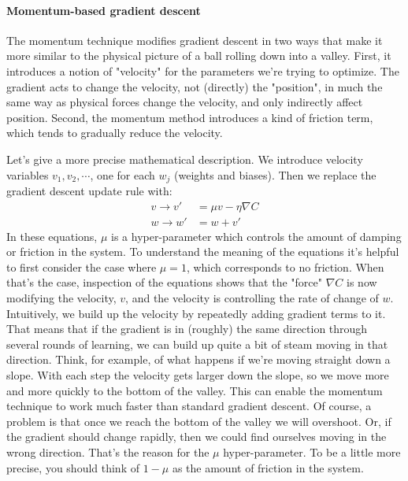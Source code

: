 \documentclass[12pt, letterpaper]{article}
\theoremstyle{definition}
\let\tb\textbf
\begin{document}
\paragraph{\tb{Momentum-based gradient descent}} The momentum technique modifies gradient descent in two ways that make it more similar to the physical picture of a ball rolling down into a valley. First, it introduces a notion of "velocity" for the parameters we're trying to optimize. The gradient acts to change the velocity, not (directly) the "position", in much the same way as physical forces change the velocity, and only indirectly affect position. Second, the momentum method introduces a kind of friction term, which tends to gradually reduce the velocity.

Let's give a more precise mathematical description. We introduce velocity variables $v_1, v_2, \cdots$, one for each $w_j$ (weights and biases). Then we replace the gradient descent update rule with:
\begin{equation}
\begin{aligned}
v \rightarrow v' &= \mu  v - \eta \nabla C \\
w \rightarrow w' &= w + v'
\end{aligned}
\end{equation}
In these equations, $\mu$ is a hyper-parameter which controls the amount of damping or friction in the system. To understand the meaning of the equations it's helpful to first consider the case where $\mu=1$, which corresponds to no friction. When that's the case, inspection of the equations shows that the "force" $\nabla C$ is now modifying the velocity, $v$, and the velocity is controlling the rate of change of $w$. Intuitively, we build up the velocity by repeatedly adding gradient terms to it. That means that if the gradient is in (roughly) the same direction through several rounds of learning, we can build up quite a bit of steam moving in that direction. Think, for example, of what happens if we're moving straight down a slope. With each step the velocity gets larger down the slope, so we move more and more quickly to the bottom of the valley. This can enable the momentum technique to work much faster than standard gradient descent. Of course, a problem is that once we reach the bottom of the valley we will overshoot. Or, if the gradient should change rapidly, then we could find ourselves moving in the wrong direction. That's the reason for the $\mu$ hyper-parameter. To be a little more precise, you should think of $1-\mu$ as the amount of friction in the system.
\end{document}

